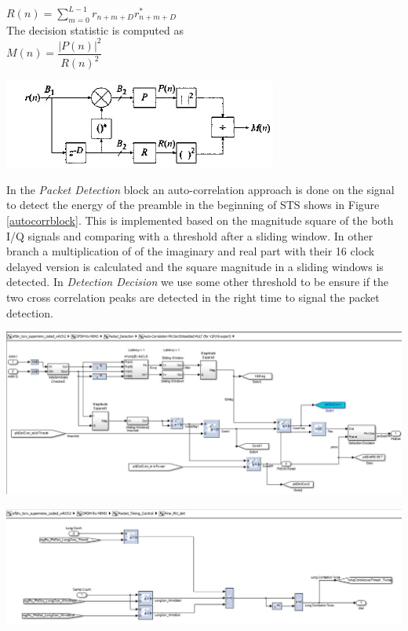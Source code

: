 $ R(n) = \sum\limits_{m=0}^{L-1} r_{n+m+D} r^{*}_{n+m+D} $\\

The decision statistic is computed as\\
$ M(n)= \dfrac{|P(n)|^{2}}{R(n)^{2}}$



\begin{center}
\includegraphics[width=\textwidth]{content/fig/schimdl_cox.JPG}
\label{schimdl_cox}
\end{center}

In the \textit{Packet Detection} block an auto-correlation approach is done on the signal to detect the energy of the preamble in the beginning of STS shows in Figure \ref{autocorrblock}. This is implemented based on the magnitude square of the both I/Q signals and comparing with a threshold after a sliding window. In other branch a multiplication of of the imaginary and real part with their 16 clock delayed version is calculated and the square magnitude in a sliding windows is detected. In \textit{Detection Decision} we use some other threshold to be ensure if the two cross correlation peaks are detected in the right time to signal the packet detection.

\begin{center}
\includegraphics[width=\textwidth]{content/fig/autocorrblock.JPG}
\label{autocorrblock}
\end{center}

\begin{center}
\includegraphics[width=\textwidth]{content/fig/fine_packetDetect.JPG}
\label{autocorrblock}
\end{center}

